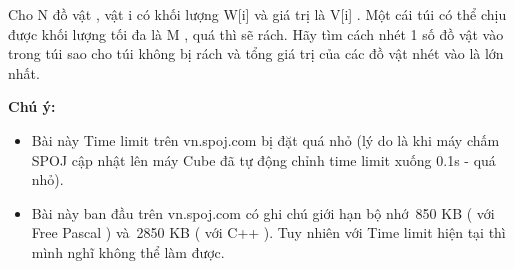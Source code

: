 Cho N đồ vật , vật i có khối lượng W[i] và giá trị là V[i] . Một cái túi có thể chịu được khối lượng tối đa là M , quá thì sẽ rách. Hãy tìm cách nhét 1 số đồ vật vào trong túi sao cho túi không bị rách và tổng giá trị của các đồ vật nhét vào là lớn nhất.

\textbf{Chú ý:}
\begin{itemize}
	\item Bài này Time limit trên vn.spoj.com bị đặt quá nhỏ (lý do là khi máy chấm SPOJ cập nhật lên máy Cube đã tự động chỉnh time limit xuống 0.1s - quá nhỏ).
	\item Bài này ban đầu trên vn.spoj.com có ghi chú giới hạn bộ nhớ 850 KB ( với Free Pascal ) và 2850 KB ( với C++ ). Tuy nhiên với Time limit hiện tại thì mình nghĩ không thể làm được.
\end{itemize}

\